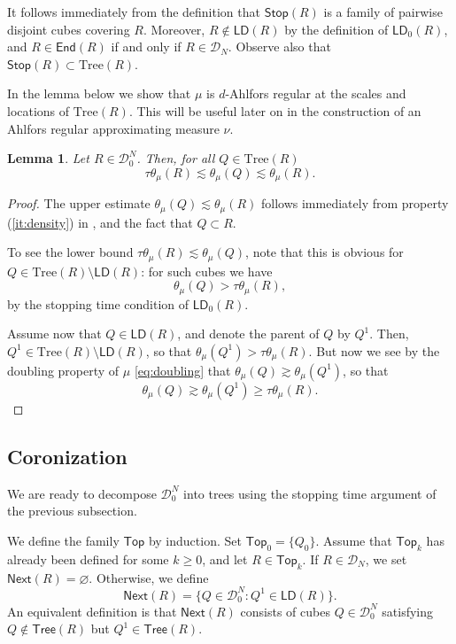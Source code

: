 \documentclass[11pt,reqno]{amsart}
\newcommand{\LD}{\mathsf{LD}}
\newcommand{\Top}{\mathsf{Top}}
\newcommand{\Tr}{\mathrm{Tree}}
\newcommand{\Stop}{\mathsf{Stop}}
\newcommand{\End}{\mathsf{End}}
\newcommand{\Tree}{\mathsf{Tree}}
\newtheorem{lemma}[theorem]{Lemma}
\theoremstyle{definition}
\theoremstyle{remark}
\numberwithin{equation}{section}
\newcommand{\DD}{\mathcal{D}}
\newcommand{\Next}{\mathsf{Next}}
\theoremstyle{theorem}
\theoremstyle{definition}
\theoremstyle{remark}
\numberwithin{equation}{section}
\begin{document}
	It follows immediately from the definition that $\Stop(R)$ is a family of pairwise disjoint cubes covering $R$. Moreover, $R\notin\LD(R)$ by the definition of $\LD_0(R)$, and $R\in\End(R)$ if and only if $R\in\DD_N$. Observe also that $\Stop(R)\subset \Tr(R)$.

 \vspace{0.5cm}
	
	In the lemma below we show that $\mu$ is $d$-Ahlfors regular at the scales and locations of $\Tr(R)$. This will be useful later on in the construction of an Ahlfors regular approximating measure $\nu$.
	\begin{lemma}\label{lem:muADR}
		Let $R\in\DD_0^{N}$. Then, for all $Q\in\Tr(R)$
		\begin{equation*}
			\tau\theta_\mu(R)\lesssim \theta_\mu(Q)\lesssim \theta_\mu(R).
		\end{equation*}
	\end{lemma}
	\begin{proof}
		The upper estimate $\theta_\mu(Q)\lesssim \theta_\mu(R)$ follows immediately from property (\ref{it:density}) in , and the fact that $Q\subset R$.
		
		To see the lower bound $\tau\theta_\mu(R)\lesssim \theta_\mu(Q)$, note that this is obvious for $Q\in\Tr(R)\setminus\LD(R)$: for such cubes we have
		\begin{equation*}
			\theta_\mu(Q)>\tau\theta_\mu(R),
		\end{equation*}
		by the stopping time condition of $\LD_0(R)$. 
		
		Assume now that $Q\in\LD(R)$, and denote the parent of $Q$ by $Q^1$. Then, $Q^1\in\Tr(R)\setminus\LD(R)$, so that $\theta_\mu(Q^1)>\tau\theta_\mu(R)$. But now we see by the doubling property of $\mu$ \eqref{eq:doubling} that $\theta_\mu(Q)\gtrsim\theta_\mu(Q^1)$, so that
		\begin{equation*}
			\theta_\mu(Q)\gtrsim\theta_\mu(Q^1)\ge \tau\theta_\mu(R).
		\end{equation*}
	\end{proof}

\subsection{Coronization}
	We are ready to decompose $\DD_0^N$ into trees using the stopping time argument of the previous subsection.

    We define the family $\Top$ by induction. Set $\Top_0 = \{Q_0\}$. Assume that $\Top_k$ has already been defined for some $k\ge 0$, and let $R\in\Top_k.$ If $R\in\DD_N$, we set $\Next(R)=\varnothing.$ Otherwise, we define
    \begin{equation*}
        \Next(R) = \{Q\in\DD_0^N : Q^1\in\LD(R)\}.
    \end{equation*}
    An equivalent definition is that $\Next(R)$ consists of cubes $Q\in \DD_0^N$ satisfying $Q\notin\Tree(R)$ but $Q^1\in\Tree(R)$.
    
\end{document}
